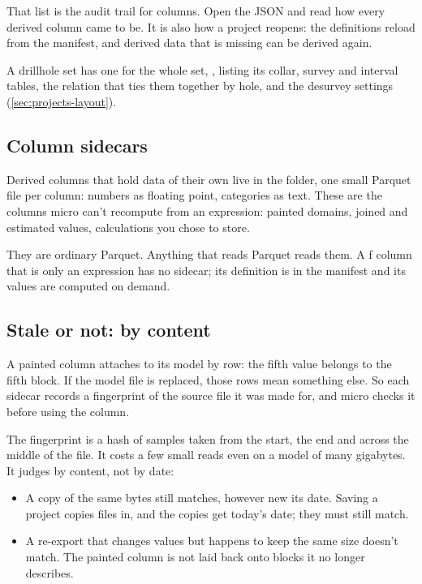 That list is the audit trail for columns. Open the JSON and read how every derived column came to be. It is also how a project reopens: the definitions reload from the manifest, and derived data that is missing can be derived again.

A drillhole set has one  for the whole set, , listing its collar, survey and interval tables, the relation that ties them together by hole, and the desurvey settings (\cref{sec:projects-layout}).

\subsection{Column sidecars}\label{sec:store-cols}
Derived columns that hold data of their own live in the  folder, one small Parquet file per column: numbers as floating point, categories as text. These are the columns micro can't recompute from an expression: painted domains, joined and estimated values, calculations you chose to store.

They are ordinary Parquet. Anything that reads Parquet reads them. A ƒ column that is only an expression has no sidecar; its definition is in the manifest and its values are computed on demand.

\subsection{Stale or not: by content}\label{sec:store-stale}
A painted column attaches to its model by row: the fifth value belongs to the fifth block. If the model file is replaced, those rows mean something else. So each sidecar records a fingerprint of the source file it was made for, and micro checks it before using the column.

The fingerprint is a hash of samples taken from the start, the end and across the middle of the file. It costs a few small reads even on a model of many gigabytes. It judges by content, not by date:

\begin{itemize}
\item A copy of the same bytes still matches, however new its date. Saving a project copies files in, and the copies get today's date; they must still match.
\item A re-export that changes values but happens to keep the same size doesn't match. The painted column is not laid back onto blocks it no longer describes.
\end{itemize}

